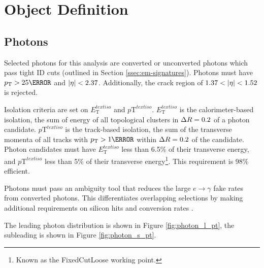 \section{Object Definition}
\subsection{Photons}

Selected photons for this analysis are converted or unconverted photons which pass tight ID cuts (outlined in Section \ref{ssec:em-signatures}). Photons must have $\pt > \unit{25}{\GeV}$ and $|\eta| < 2.37$. Additionally, the crack region of $1.37 < |\eta| < 1.52$ is rejected.

Isolation criteria are set on $E_{\text{T}}^{text{iso}}$ and $p{\text{T}}^{text{iso}}$. $E_{\text{T}}^{text{iso}}$ is the calorimeter-based isolation, the sum of energy of all topological clusters in $\Delta R = 0.2$ of a photon candidate. $p{\text{T}}^{text{iso}}$ is the track-based isolation, the sum of the transverse momenta of all tracks with $\pt > \unit{1}{\GeV}$ within $\Delta R = 0.2$ of the candidate. Photon candidates must have $E_{\text{T}}^{text{iso}}$ less than 6.5\% of their transverse energy, and $p{\text{T}}^{text{iso}}$ less than 5\% of their transverse energy\footnote{Known as the FixedCutLoose working point.}. This requirement is 98\% efficient. 


Photons must pass an ambiguity tool that reduces the large $e\rightarrow\gamma$ fake rates from converted photons. This differentiates overlapping selections by making additional requirements on silicon hits and conversion rates \cite{r1-photonID}.


The leading photon \pt distribution is shown in Figure \ref{fig:photon_l_pt}, the subleading is shown in Figure \ref{fig:photon_s_pt}.

